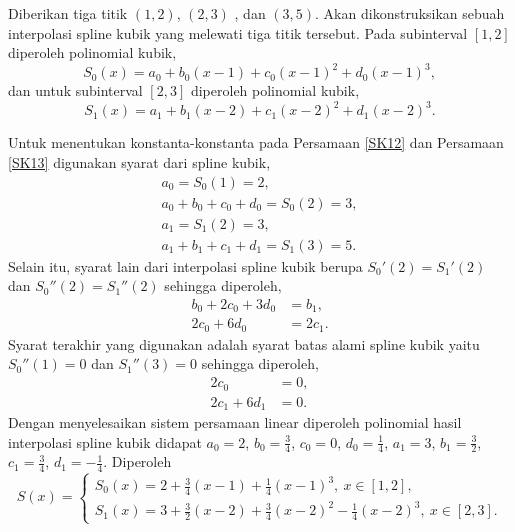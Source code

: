 \begin{contoh}
	Diberikan tiga titik $(1,2)$, $(2,3)$ , dan $(3,5)$. Akan dikonstruksikan sebuah interpolasi spline kubik yang melewati tiga titik tersebut. Pada subinterval $[1,2]$ diperoleh polinomial kubik,
	\begin{equation}\label{SK12}
		S_0(x) = a_0 + b_0(x-1) + c_0(x-1)^2 + d_0(x-1)^3,
	\end{equation}
	dan untuk subinterval $[2,3]$ diperoleh polinomial kubik,
	\begin{equation}\label{SK13}
		S_1(x) = a_1 + b_1(x-2) + c_1(x-2)^2 + d_1(x-2)^3.
	\end{equation}
 
	Untuk menentukan konstanta-konstanta pada Persamaan \eqref{SK12} dan Persamaan \eqref{SK13} digunakan syarat dari spline kubik,
	\begin{align*}
		a_0 = S_0(1) = 2 , \\
		a_0 + b_0 + c_0 + d_0 = S_0(2) = 3 , \\
		a_1 = S_1(2) = 3 , \\
		a_1 + b_1 + c_1 + d_1 = S_1(3) = 5.
	\end{align*}
	Selain itu, syarat lain dari interpolasi spline kubik berupa $ S_0'(2) = S_1'(2) $ dan \mbox{$ S_0''(2) = S_1''(2) $} sehingga diperoleh,
	\begin{align*}
		b_0 + 2c_0 + 3d_0 &= b_1, \\
		2c_0 + 6d_0 &= 2c_1.
	\end{align*}
	Syarat terakhir yang digunakan adalah syarat batas alami spline kubik yaitu \mbox{$ S_0''(1) = 0 $} dan $ S_1''(3) = 0 $  sehingga diperoleh,
	\begin{align*}
		2c_0&=0, \\
		2c_1 + 6d_1 &= 0.
	\end{align*}
	Dengan menyelesaikan sistem persamaan linear diperoleh polinomial hasil interpolasi spline kubik didapat $a_0 = 2$, $b_0 = \frac{3}{4}$, $c_0=0$, $d_0=\frac{1}{4}$, $a_1 = 3$, $b_1 = \frac{3}{2}$, $c_1=\frac{3}{4}$, $d_1=-\frac{1}{4}$. Diperoleh
	\begin{equation}\label{SPContoh}
		S(x) = 
		\begin{cases}
			S_0(x) = 2 + \frac{3}{4}(x-1) + \frac{1}{4}(x-1)^3,\: x\in[1,2], \\
			S_1(x) = 3 + \frac{3}{2}(x-2) + \frac{3}{4}(x-2)^2 - \frac{1}{4}(x-2)^3,\: x \in [2,3].
		\end{cases}
	\end{equation}
	\begin{figure}[H]

\end{figure}
\end{contoh}
